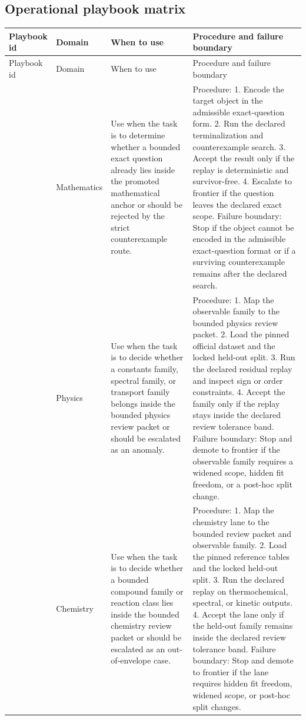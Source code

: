 \subsection{Operational playbook matrix}
\begin{longtable}{@{}L{0.15\textwidth}L{0.13\textwidth}L{0.18\textwidth}L{0.38\textwidth}@{}}
\toprule
Playbook id & Domain & When to use & Procedure and failure boundary \\
\midrule
\endfirsthead
\toprule
Playbook id & Domain & When to use & Procedure and failure boundary \\
\midrule
\endhead
{} & Mathematics & Use when the task is to determine whether a bounded exact question already lies inside the promoted mathematical anchor or should be rejected by the strict counterexample route. & Procedure: 1. Encode the target object in the admissible exact-question form. 2. Run the declared terminalization and counterexample search. 3. Accept the result only if the replay is deterministic and survivor-free. 4. Escalate to frontier if the question leaves the declared exact scope. \allowbreak Failure boundary: Stop if the object cannot be encoded in the admissible exact-question format or if a surviving counterexample remains after the declared search. \\
 & Physics & Use when the task is to decide whether a constants family, spectral family, or transport family belongs inside the bounded physics review packet or should be escalated as an anomaly. & Procedure: 1. Map the observable family to the bounded physics review packet. 2. Load the pinned official dataset and the locked held-out split. 3. Run the declared residual replay and inspect sign or order constraints. 4. Accept the family only if the replay stays inside the declared review tolerance band. \allowbreak Failure boundary: Stop and demote to frontier if the observable family requires a widened scope, hidden fit freedom, or a post-hoc split change. \\
 & Chemistry & Use when the task is to decide whether a bounded compound family or reaction class lies inside the bounded chemistry review packet or should be escalated as an out-of-envelope case. & Procedure: 1. Map the chemistry lane to the bounded review packet and observable family. 2. Load the pinned reference tables and the locked held-out split. 3. Run the declared replay on thermochemical, spectral, or kinetic outputs. 4. Accept the lane only if the held-out family remains inside the declared review tolerance band. \allowbreak Failure boundary: Stop and demote to frontier if the lane requires hidden fit freedom, widened scope, or post-hoc split changes. \\

\end{longtable}
